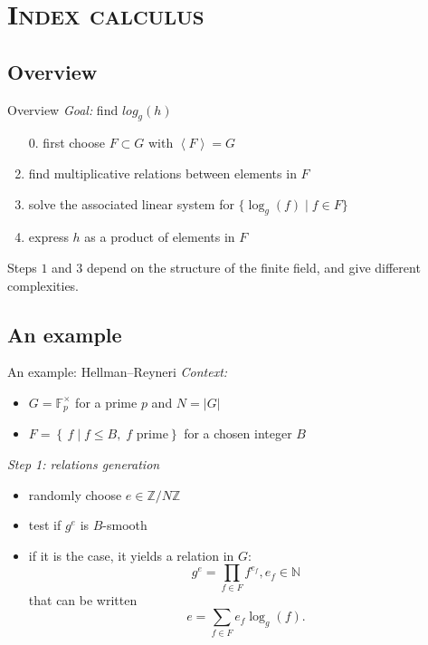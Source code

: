 \documentclass[xcolor=x11names,compress]{beamer}
\theoremstyle{break}
\theoremstyle{sc}
\theoremstyle{definition}
\theoremstyle{remark}
\begin{document}
\section{\scshape Index calculus}
\subsection{Overview}
\begin{frame}{Overview}
  \emph{Goal:} find $log_g(h)$ 
  \begin{enumerate}
    \item[0.] first choose $F\subset
  G$ with $\left\langle F \right\rangle = G$
    \item find multiplicative relations between elements in $F$
    \item solve the associated linear system for $\{ \log_g(f)\;|\;f\in F\}$
    \item express $h$ as a product of elements in $F$
  \end{enumerate}
  Steps $1$ and $3$ depend on the structure of the finite field, and
  give different complexities.
\end{frame}

\subsection{An example}
\begin{frame}{An example: Hellman–Reyneri}
  \emph{Context:}
  \begin{itemize}
    \item $G = \mathbb{F}_p^\times$ for a prime $p$ and $N = |G|$
    \item $F = \left\{\, f \;|\; f \leq B,\; f \text{ prime}
    \right\}$ for a chosen integer $B$
  \end{itemize}

  \emph{Step 1: relations generation}
  \begin{itemize}
    \item randomly choose $e\in \mathbb{Z}/N\mathbb{Z}$
    \item test if $g^e$ is $B$-smooth
    \item if it is the case, it yields a relation in $G$:
      \[ 
        g^e = \prod_{f\in F}f^{e_f}, e_f\in \mathbb{N}
      \]
      that can be written
      \[
        e = \sum_{f\in F}e_f\log_g(f).
      \]
  \end{itemize}
\end{frame}
\end{document}

